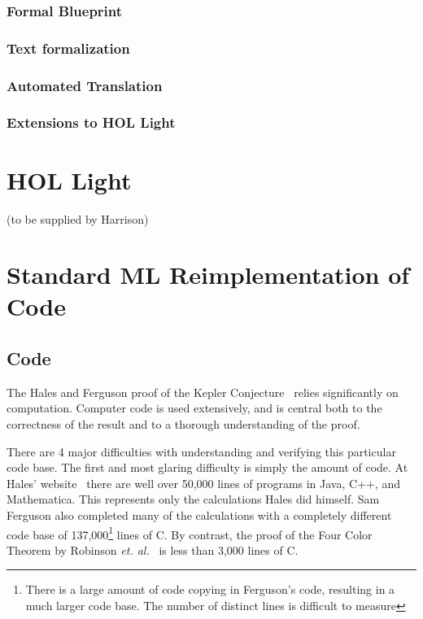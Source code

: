 \documentclass[11pt]{amsart}
\begin{document}
\subsubsection{Formal Blueprint}

\subsubsection{Text formalization}

\subsubsection{Automated Translation}

\subsubsection{Extensions to HOL Light}



\section{HOL Light}

(to be supplied by Harrison)


\section{Standard ML Reimplementation of Code}

\subsection{Code}
\label{sec:code}



The Hales and Ferguson proof of the Kepler
Conjecture~\cite{Hales:2005:Annals} relies significantly
on computation. Computer code is used extensively, and is
central both to the correctness of the result and to a thorough
understanding of the proof. 

  There are 4 major difficulties with understanding and verifying
this particular code base. The first and most glaring difficulty is
simply the amount of code. At Hales' website~\cite{website:Hales:1998:Code}
there are well over 50,000 lines of programs in Java, C++, and
Mathematica. This represents only the calculations Hales did himself.
Sam Ferguson also completed many of the calculations with a completely
different code base of 137,000\footnote{There is a large amount of
code copying in Ferguson's code, resulting in a much larger code base.
The number of distinct lines is difficult to measure} lines of C. By
contrast, the proof of the Four Color Theorem by Robinson \textit{et.
al.}~\cite{Robertson:1997:JCTB} is less than 3,000 lines of C.
\end{document}
